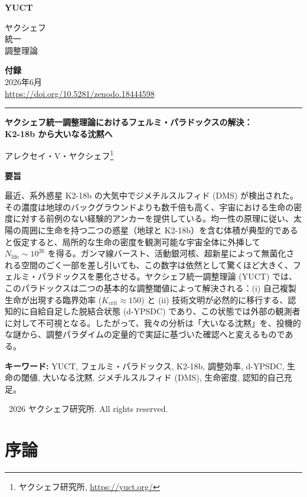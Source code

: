 \documentclass[11pt,a4paper]{article}
\newcommand{\makeheader}{%
	\noindent
	\begin{minipage}{0.17\textwidth}
		\raggedright
		{\sffamily\bfseries\color{skyblue}\fontsize{46}{46}\selectfont YUCT}%
	\end{minipage}%
	\hspace{30pt}
	\begin{minipage}{0.32\textwidth}
		\raggedright
		{\sffamily\fontsize{11}{13}\selectfont ヤクシェフ\\ 統一\\ 調整理論}%
	\end{minipage}%
	\hfill
	\begin{minipage}{0.38\textwidth}
		\raggedleft
		{\sffamily\bfseries 付録}\\
		{\sffamily 2026年6月}\\
		{\sffamily\footnotesize \url{https://doi.org/10.5281/zenodo.18444598}}%
	\end{minipage}
	\par\vspace{5pt}
	\noindent\textcolor{gold}{\rule{\textwidth}{1.6pt}}
	\par\vspace{0pt}
}
\begin{document}
	\renewcommand{\thepage}{\arabic{page}}
	\thispagestyle{firstpage}
	\makeheader
	
	\vspace{0cm}
	{\LARGE\bfseries ヤクシェフ統一調整理論におけるフェルミ・パラドックスの解決：\\ K2-18b から大いなる沈黙へ \par}
	\vspace{0.2cm}
	
	{\large アレクセイ・V・ヤクシェフ\footnote{ヤクシェフ研究所, \url{https://yuct.org/}}} \\
	\vspace{0.0cm}
	
	{\color{darkblue}\textbf{\LARGE 要旨}} \par
	{\large
		\noindent
		最近、系外惑星 K2-18b の大気中でジメチルスルフィド (DMS) が検出された。その濃度は地球のバックグラウンドよりも数千倍も高く、宇宙における生命の密度に対する前例のない経験的アンカーを提供している。均一性の原理に従い、太陽の周囲に生命を持つ二つの惑星（地球と K2-18b）を含む体積が典型的であると仮定すると、局所的な生命の密度を観測可能な宇宙全体に外挿して \(N_{\mathrm{life}} \sim 10^{26}\) を得る。ガンマ線バースト、活動銀河核、超新星によって無菌化される空間のごく一部を差し引いても、この数字は依然として驚くほど大きく、フェルミ・パラドックスを悪化させる。ヤクシェフ統一調整理論 (YUCT) では、このパラドックスは二つの基本的な調整閾値によって解決される：(i) 自己複製生命が出現する臨界効率 (\(K_{\mathrm{crit}}\approx150\)) と (ii) 技術文明が必然的に移行する、認知的に自給自足した脱結合状態 (d-YPSDC) であり、この状態では外部の観測者に対して不可視となる。したがって、我々の分析は「大いなる沈黙」を、投機的な謎から、調整パラダイムの定量的で実証に基づいた確認へと変えるものである。
	}
	
	\vspace{0.1cm}
	\noindent
	{\color{darkblue}\textbf{キーワード:}} YUCT, フェルミ・パラドックス, K2-18b, 調整効率, d-YPSDC, 生命の閾値, 大いなる沈黙, ジメチルスルフィド (DMS), 生命密度, 認知的自己充足。
	
	\vspace{0.5cm}
	\noindent
	\textcopyright\ 2026 ヤクシェフ研究所. All rights reserved.
	
	\tableofcontents
	\newpage
	
	\section{序論}
	\label{sec:intro}
	
\end{document}

